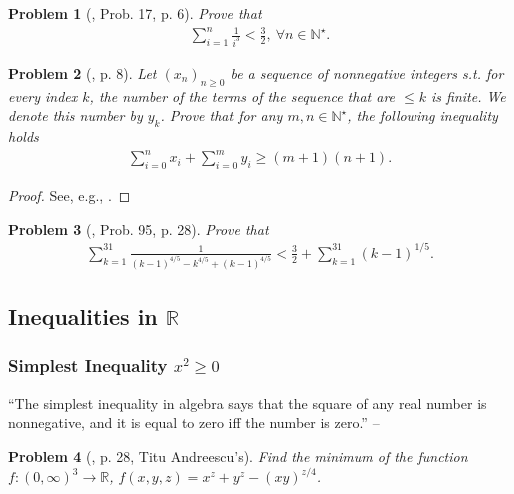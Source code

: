 \documentclass[oneside]{book}
\numberwithin{equation}{section}
\newtheorem{problem}{Problem}[section]
\begin{document}
\begin{problem}[\cite{Gelca_Andreescu2017}, Prob. 17, p. 6]
	Prove that
	\begin{align*}
		\sum_{i=1}^n \frac{1}{i^3} < \frac{3}{2},\ \forall n\in\mathbb{N}^\star.
	\end{align*}
\end{problem}

\begin{problem}[\cite{Gelca_Andreescu2017}, p. 8]
	Let $(x_n)_{n\ge 0}$ be a sequence of nonnegative integers s.t. for every index $k$, the number of the terms of the sequence that are $\le k$ is finite. We denote this number by $y_k$. Prove that for any $m,n\in\mathbb{N}^\star$, the following inequality holds
	\begin{align*}
		\sum_{i=0}^n x_i + \sum_{i=0}^m y_i\ge(m + 1)(n + 1).
	\end{align*}
\end{problem}

\begin{proof}[Proof]
	See, e.g., \cite[pp. 8--9]{Gelca_Andreescu2017}.
\end{proof}

\begin{problem}[\cite{Gelca_Andreescu2017}, Prob. 95, p. 28]
	Prove that
	\begin{align}
		\sum_{k=1}^{31} \frac{1}{(k - 1)^{4/5} - k^{4/5} + (k - 1)^{4/5}} < \frac{3}{2} + \sum_{k=1}^{31} (k - 1)^{1/5}.
	\end{align}
\end{problem}

\subsection{Inequalities in $\mathbb{R}$}

\subsubsection{Simplest Inequality $x^2\ge 0$}
``The simplest inequality in algebra says that the square of any real number is nonnegative, and it is equal to zero iff the number is zero.'' -- \cite[Subsect. 2.1.2, p. 28]{Gelca_Andreescu2017}

\begin{problem}[\cite{Gelca_Andreescu2017}, p. 28, Titu Andreescu's]
	Find the minimum of the function $f:(0,\infty)^3\to\mathbb{R}$, $f(x,y,z) = x^z + y^z - (xy)^{z/4}$.
\end{problem}
\end{document}
